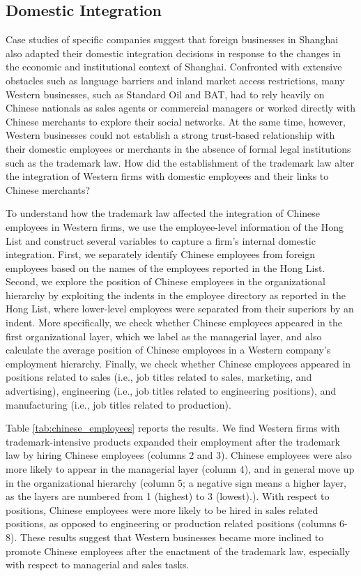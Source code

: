 \documentclass[12pt]{article}
\begin{document}
\subsection{Domestic Integration}

Case studies of specific companies \citep{Cochran2000} suggest that foreign businesses in Shanghai also adapted their domestic integration decisions in response to the changes in the economic and institutional context of Shanghai. Confronted with extensive obstacles such as language barriers and inland market access restrictions, many Western businesses, such as Standard Oil and BAT, had to rely heavily on Chinese nationals as sales agents or commercial managers or worked directly with Chinese merchants to explore their social networks. At the same time, however, Western businesses could not establish a strong trust-based relationship with their domestic employees or merchants in the absence of formal legal institutions such as the trademark law.  How did the establishment of the trademark law alter the integration of Western firms with domestic employees and their links to Chinese merchants? 

To understand how the trademark law affected the integration of Chinese employees in Western firms, we use the employee-level information of the Hong List and construct several variables to capture a firm's internal domestic integration. First, we separately identify Chinese employees from foreign employees based on the names of the employees reported in the Hong List. Second, we explore the position of Chinese employees in the organizational hierarchy by exploiting the indents in the employee directory as reported in the Hong List, where lower-level employees were separated from their superiors by an indent. More specifically, we check whether Chinese employees appeared in the first organizational layer, which we label as the managerial layer, and also calculate the average position of Chinese employees in a Western company's employment hierarchy. Finally, we check whether Chinese employees appeared in positions related to sales (i.e., job titles related to sales, marketing, and advertising), engineering (i.e., job titles related to engineering positions), and manufacturing (i.e., job titles related to production). 

Table \ref{tab:chinese_employees} reports the results. We find Western firms with trademark-intensive products expanded their employment after the trademark law by hiring Chinese employees (columns 2 and 3). Chinese employees were also more likely to appear in the managerial layer (column 4), and in general move up in the organizational hierarchy (column 5; a negative sign means a higher layer, as the layers are numbered from 1 (highest) to 3 (lowest).). With respect to positions, Chinese employees were more likely to be hired in sales related positions, as opposed to engineering or production related positions (columns 6-8). These results suggest that Western businesses  became more inclined to promote Chinese employees after the enactment of the trademark law, especially with respect to managerial and sales tasks.
\end{document}
